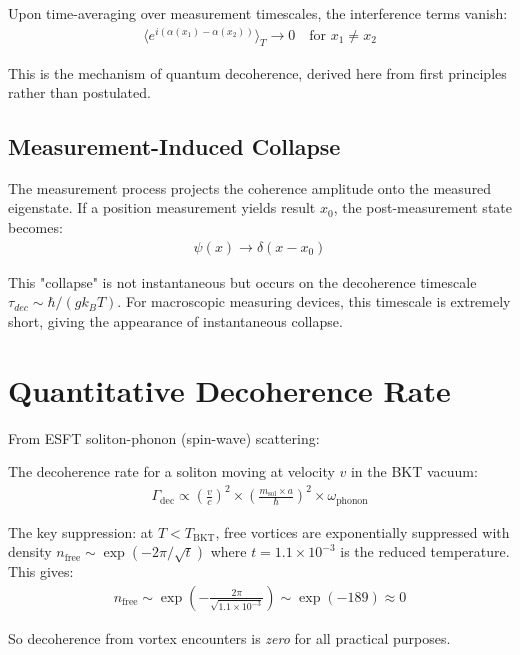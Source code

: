 ﻿\documentclass[twocolumn,showpacs,preprintnumbers,amsmath,amssymb,prd]{revtex4-2}
\begin{document}
Upon time-averaging over measurement timescales, the interference terms vanish:
\begin{align}
\langle e^{i(\alpha(x_1) - \alpha(x_2))}\rangle_T \to 0 \quad \text{for } x_1 \neq x_2
\end{align}

This is the mechanism of quantum decoherence, derived here from first principles rather than postulated.

\subsection{Measurement-Induced Collapse}

The measurement process projects the coherence amplitude onto the measured eigenstate. If a position measurement yields result $x_0$, the post-measurement state becomes:
\begin{align}
\psi(x) \to \delta(x - x_0)
\end{align}

This "collapse" is not instantaneous but occurs on the decoherence timescale $\tau_{dec} \sim \hbar/(gk_BT)$. For macroscopic measuring devices, this timescale is extremely short, giving the appearance of instantaneous collapse.

\section{Quantitative Decoherence Rate}

From ESFT soliton-phonon (spin-wave) scattering:

The decoherence rate for a soliton moving at velocity $v$ in the BKT vacuum:
\begin{align}
\Gamma_{\text{dec}} \propto \left(\frac{v}{c}\right)^2 \times \left(\frac{m_{\text{sol}} \times a}{\hbar}\right)^2 \times \omega_{\text{phonon}}
\end{align}

The key suppression: at $T < T_{\text{BKT}}$, free vortices are exponentially suppressed with density $n_{\text{free}} \sim \exp(-2\pi/\sqrt{t})$ where $t = 1.1 \times 10^{-3}$ is the reduced temperature. This gives:
\begin{align}
n_{\text{free}} \sim \exp\left(-\frac{2\pi}{\sqrt{1.1 \times 10^{-3}}}\right) \sim \exp(-189) \approx 0
\end{align}

So decoherence from vortex encounters is \emph{zero} for all practical purposes.
\end{document}
